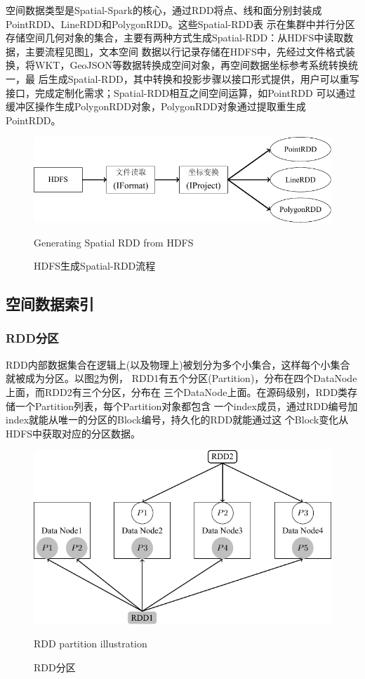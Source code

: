 空间数据类型是Spatial-Spark的核心，通过RDD将点、线和面分别封装成PointRDD、LineRDD和PolygonRDD。这些Spatial-RDD表
示在集群中并行分区存储空间几何对象的集合，主要有两种方式生成Spatial-RDD：从HDFS中读取数据，主要流程见图\ref{fig:spatialrdd}，文本空间
数据以行记录存储在HDFS中，先经过文件格式装换，将WKT，GeoJSON等数据转换成空间对象，再空间数据坐标参考系统转换统一，最
后生成Spatial-RDD，其中转换和投影步骤以接口形式提供，用户可以重写接口，完成定制化需求；Spatial-RDD相互之间空间运算，如PointRDD
可以通过缓冲区操作生成PolygonRDD对象，PolygonRDD对象通过提取重生成PointRDD。
\begin{figure}
\centering
\includegraphics[scale=0.9]{figures/spatialRDD.pdf}
\caption{HDFS生成Spatial-RDD流程}{Generating Spatial RDD from HDFS} 
\label{fig:spatialrdd}
\end{figure}


\subsection{空间数据索引}
\subsubsection{RDD分区}
RDD内部数据集合在逻辑上(以及物理上)被划分为多个小集合，这样每个小集合就被成为分区。以图\ref{fig:rddpartition}为例，
RDD1有五个分区(Partition)，分布在四个DataNode上面，而RDD2有三个分区，分布在
三个DataNode上面。在源码级别，RDD类存储一个Partition列表，每个Partition对象都包含
一个index成员，通过RDD编号加index就能从唯一的分区的Block编号\cite{Zaharia2012Resilient}，持久化的RDD就能通过这
个Block变化从HDFS中获取对应的分区数据。
\begin{figure}
\centering
\includegraphics[scale=0.8]{figures/rddpartition.pdf}
\caption{RDD分区}{RDD partition illustration}
\label{fig:rddpartition}
\end{figure}

